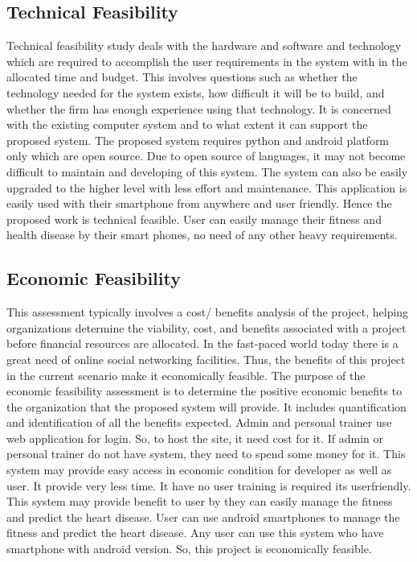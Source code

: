 \documentclass[a4paper,12pt,toc=flat]{report}
\begin{document}
{	
	\pagebreak
	\subsection{Technical Feasibility}
	
	Technical feasibility study deals with the hardware and software and technology which are
	required to accomplish the user requirements in the system with in the allocated time and
	budget. This involves questions such as whether the technology needed for the system
	exists, how difficult it will be to build, and whether the firm has enough experience using
	that technology. It is concerned with the existing computer system and to what extent
	it can support the proposed system. The proposed system requires python and android
	platform only which are open source. Due to open source of languages, it may not become
	difficult to maintain and developing of this system. The system can also be easily upgraded
	to the higher level with less effort and maintenance. This application is easily used with
	their smartphone from anywhere and user friendly. Hence the proposed work is technical
	feasible. User can easily manage their fitness and health disease by their smart phones, no need of any other heavy requirements.
	
	\subsection{Economic Feasibility}
	
	This assessment typically involves a cost/ benefits analysis of the project, helping organizations determine the viability, cost, and benefits associated with a project before financial
	resources are allocated. In the fast-paced world today there is a great need of online social networking facilities. Thus, the benefits of this project in the current scenario make it
	economically feasible. The purpose of the economic feasibility assessment is to determine
	the positive economic benefits to the organization that the proposed system will provide. It
	includes quantification and identification of all the benefits expected. Admin and personal trainer use web application for login. So, to host the site, it need cost for it. If admin or personal trainer do not have system, they need to spend some money for it. This
	system may provide easy access in economic condition for developer as well as user. It provide very less time. It have no user training is required its userfriendly. This
	system may provide benefit to user by they can easily manage the fitness and predict the heart disease. User can use android smartphones to manage the fitness and predict the heart disease. Any user can use this system who have smartphone with android version. So, this project is economically feasible.
	
}
\end{document}
